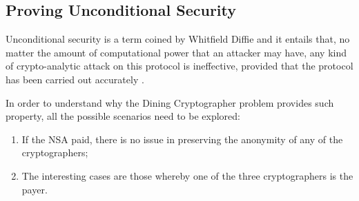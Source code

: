 \subsection{Proving Unconditional Security}
Unconditional security is a term coined by Whitfield Diffie and it entails that, no matter the amount of computational power that an attacker may have, any kind of crypto-analytic attack on this protocol is ineffective, provided that the protocol has been carried out accurately \cite{Diffie1}.

In order to understand why the Dining Cryptographer problem provides such property, all the possible scenarios need to be explored:
\begin{enumerate}
    \item If the NSA paid, there is no issue in preserving the anonymity of any of the cryptographers;
    \item The interesting cases are those whereby one of the three cryptographers is the payer. 
    

\end{enumerate}
